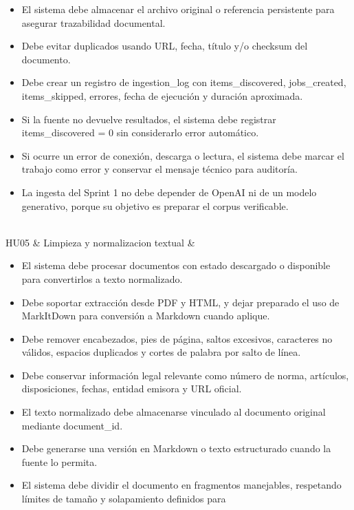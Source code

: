 \documentclass[12pt,a4paper,oneside]{report}
\begin{document}
\begin{longtable}[]
\begin{minipage}[t]{\linewidth}
\begin{itemize}
  título, fecha de publicación, URL de origen, tipo de documento,
  checksum y estado de procesamiento.
\item
  El sistema debe almacenar el archivo original o referencia persistente
  para asegurar trazabilidad documental.
\item
  Debe evitar duplicados usando URL, fecha, título y/o checksum del
  documento.
\item
  Debe crear un registro de ingestion\_log con items\_discovered,
  jobs\_created, items\_skipped, errores, fecha de ejecución y duración
  aproximada.
\item
  Si la fuente no devuelve resultados, el sistema debe registrar
  items\_discovered = 0 sin considerarlo error automático.
\item
  Si ocurre un error de conexión, descarga o lectura, el sistema debe
  marcar el trabajo como error y conservar el mensaje técnico para
  auditoría.
\item
  La ingesta del Sprint 1 no debe depender de OpenAI ni de un modelo
  generativo, porque su objetivo es preparar el corpus verificable.
\end{itemize}
\end{minipage} \\
HU05 & Limpieza y normalizacion textual &
\begin{minipage}[t]{\linewidth}\raggedright
\begin{itemize}
\item
  El sistema debe procesar documentos con estado descargado o disponible
  para convertirlos a texto normalizado.
\item
  Debe soportar extracción desde PDF y HTML, y dejar preparado el uso de
  MarkItDown para conversión a Markdown cuando aplique.
\item
  Debe remover encabezados, pies de página, saltos excesivos, caracteres
  no válidos, espacios duplicados y cortes de palabra por salto de
  línea.
\item
  Debe conservar información legal relevante como número de norma,
  artículos, disposiciones, fechas, entidad emisora y URL oficial.
\item
  El texto normalizado debe almacenarse vinculado al documento original
  mediante document\_id.
\item
  Debe generarse una versión en Markdown o texto estructurado cuando la
  fuente lo permita.
\item
  El sistema debe dividir el documento en fragmentos manejables,
  respetando límites de tamaño y solapamiento definidos para

\end{itemize}
\end{minipage}
\end{longtable}
\end{document}
